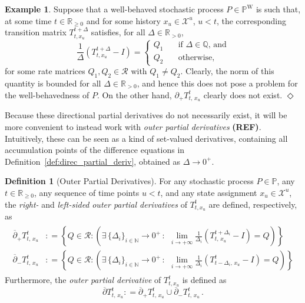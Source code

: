 \documentclass[10pt]{paper}
\theoremstyle{definition}
\newtheorem{exmp}{Example}%
\newtheorem{definition}{Definition}
\newcommand{\nats}{\mathbb{N}}
\newcommand{\reals}{\mathbb{R}}
\newcommand{\realspos}{\reals_{>0}}
\newcommand{\realsnonneg}{\reals_{\geq 0}}
\newcommand{\states}{\mathcal{X}}
\newcommand{\processes}{\mathbb{P}}
\newcommand{\wprocesses}{\processes^{\mathrm{W}}}
\newcommand{\coloneqq}{:\!=}
\newcommand{\exampleend}{\hfill$\Diamond$}
\begin{document}
\begin{exmp}\label{exmp:well-behaved-no-deriv}
Suppose that a well-behaved stochastic process $P\in\wprocesses$ is such that, at some time $t\in\realsnonneg$ and for some history $x_u\in\states^u$, $u<t$, the corresponding transition matrix $T_{t,x_u}^{t+\Delta}$ satisfies, for all $\Delta\in\realspos$,
\begin{equation*}
\frac{1}{\Delta}(T_{t,x_u}^{t+\Delta} - I) = \left\{\begin{array}{cl}
Q_1 & \quad \text{if $\Delta\in\mathbb{Q}$, and} \\
Q_2 & \quad \text{otherwise,}
\end{array}\right.
\end{equation*}
for some rate matrices $Q_1,Q_2\in\mathcal{R}$ with $Q_1\neq Q_2$. Clearly, the norm of this quantity is bounded for all $\Delta\in\realspos$, and hence this does not pose a problem for the well-behavedness of $P$. On the other hand, $\partial_{+}{T_{t,\,x_u}^t}$ clearly does not exist.
\exampleend
\end{exmp}

Because these directional partial derivatives do not necessarily exist, it will be more convenient to instead work with \emph{outer partial derivatives} {\bf (REF)}. Intuitively, these can be seen as a kind of set-valued derivatives, containing all accumulation points of the difference equations in Definition~\ref{def:direc_partial_deriv}, obtained as $\Delta\to0^+$.

\begin{definition}[Outer Partial Derivatives]
For any stochastic process $P\in\processes$, any $t\in\realsnonneg$, any sequence of time points $u<t$, and any state assignment $x_u\in\states^u$, the \emph{right-} and \emph{left-sided} \emph{outer partial derivatives} of $T_{t,x_u}^t$ are defined, respectively, as
\begin{align}
\label{eq:rightouterderivative}
\begin{split}
\overline{\partial}_{+}
{T^t_{t,\,x_u}}
&\coloneqq
\left\{
Q\in\mathcal{R}
\colon
\left(\exists \,\{\Delta_i\}_{i\in\nats}\to0^+\,:\,
~
\lim_{i\to+\infty}
\frac{1}{\Delta_i}
(T^{t+\Delta_i}_{t,\,x_u}-I)
=Q
\right)
\right\}\\
\overline{\partial}_{-}
{T^t_{t,\,x_u}}
&\coloneqq
\left\{
Q\in\mathcal{R}
\colon
\left(\exists\, \{\Delta_i\}_{i\in\nats}\to0^+\,:\,
~
\lim_{i\to+\infty}
\frac{1}{\Delta_i}
(T^{t}_{t-\Delta_i,\,x_u}-I)
=Q
\right)
\right\}
\end{split}
\end{align}
Furthermore, the \emph{outer partial derivative} of $T_{t,x_u}^t$ is defined as
\begin{equation*}
\overline{\partial}
{T^t_{t,\,x_u}}
\coloneqq
\overline{\partial}_{+}
{T^t_{t,\,x_u}}
\cup
\overline{\partial}_{-}
{T^t_{t,\,x_u}}\,.
\end{equation*}
\end{definition}
\end{document}
